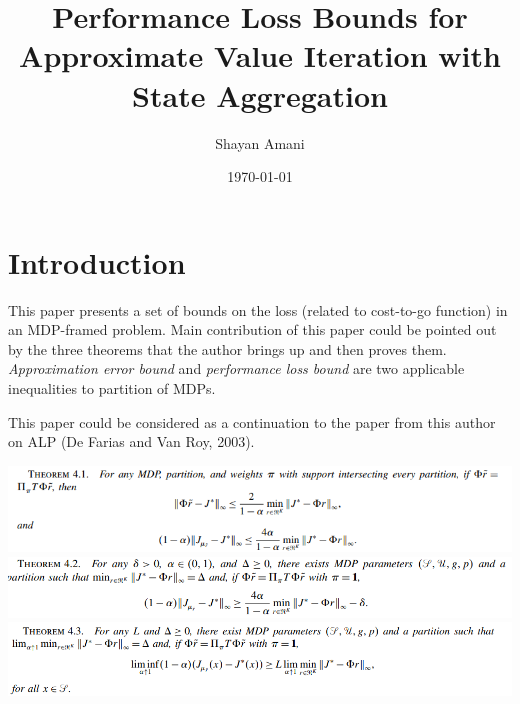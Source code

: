 \documentclass[a4paper,12pt]{article}
\title{Performance Loss Bounds for Approximate Value Iteration with State Aggregation}
\author{Shayan Amani}
\date{\today}
\begin{document}
\maketitle

\section{Introduction}
This paper presents a set of bounds on the loss (related to cost-to-go function) in an MDP-framed problem. Main contribution of this paper could be pointed out by the three theorems that the author brings up and then proves them. \textit{Approximation error bound} and \textit{performance loss bound} are two applicable inequalities to partition of MDPs.

This paper could be considered as a continuation to the paper from this author on ALP (De Farias and Van Roy, 2003).

\includegraphics[width=1\columnwidth]{theorem4-1.png}
\includegraphics[width=1\columnwidth]{theorem4-2.png}
\includegraphics[width=1\columnwidth]{theorem4-3.png}







\end{document}
